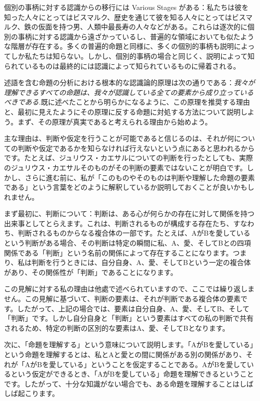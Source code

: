 \documentclass[a4paper,11pt,openany]{ltjsbook}
\begin{document}
個別の事柄に対する認識からの移行には Various Stages がある：私たちは彼を知った人々にとってはビスマルク、歴史を通じて彼を知る人々にとってはビスマルク、鉄の仮面を持つ男、人類中最長寿の人々などがある。これらは逐次的に個別の事柄に対する認識から遠ざかっているし、普遍的な領域においても似たような階層が存在する。多くの普遍的命題と同様に、多くの個別的事柄も説明によってしか私たちは知らない。しかし、個別的事柄の場合と同じく、説明によって知られているものは最終的には認識によって知られているものに帰着される。

述語を含む命題の分析における根本的な認識論的原理は次の通りである：\textit{我々が理解できるすべての命題は、我々が認識している全ての要素から成り立っているべきである.}既に述べたことから明らかになるように、この原理を推奨する理由と、最初に見えたようにその原理に反する命題に対処する方法について説明しよう。まず、その原理が真実であると考えられる理由から始めよう。


主な理由は、判断や仮定を行うことが可能であると信じるのは、それが何についての判断や仮定であるかを知らなければ行えないという点にあると思われるからです。たとえば、ジュリウス・カエサルについての判断を行ったとしても、実際のジュリウス・カエサルそのものがその判断の要素ではないことが明白です。しかし、さらに進む前に、私が「このものやそのものは判断や理解した命題の要素である」という言葉をどのように解釈しているか説明しておくことが良いかもしれません。

まず最初に、判断について：判断は、ある心が何らかの存在に対して関係を持つ出来事としてとらえます。これは、判断されるものが構成する存在たち、すなわち、判断されるものからなる複合体の一部です。たとえば、AがBを愛しているという判断がある場合、その判断は特定の瞬間に私、A、愛、そしてBとの四項関係である「判断」という名前の関係によって存在することになります。つまり、私は判断を行うときには、自分自身、A、愛、そしてBという一定の複合体があり、その関係性が「判断」であることになります。

この見解に対する私の理由は他處で述べられていますので、ここでは繰り返しません。この見解に基づいて、判断の要素は、それが判断である複合体の要素です。したがって、上記の場合では、要素は自分自身、A、愛、そしてB、そして「判断」です。しかし自分自身と「判断」という要素はすべての私の判断で共有されるため、特定の判断の区別的な要素はA、愛、そしてBとなります。

次に、「命題を理解する」という意味について説明します。「AがBを愛している」という命題を理解するとは、私とAと愛との間に関係がある別の関係があり、それが「AがBを愛している」ということを仮定することである。AがBを愛しているという仮定ができるとき、「AがBを愛している」命題を理解できるということです。したがって、十分な知識がない場合でも、ある命題を理解することはしばしば起こります。
\end{document}
